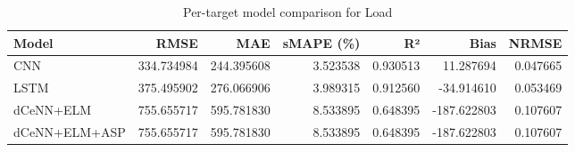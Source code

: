 \begin{table}
\caption{Per-target model comparison for Load}
\begin{tabular}{lrrrrrr}
\toprule
Model & RMSE & MAE & sMAPE (\%) & R² & Bias & NRMSE \\
\midrule
CNN & 334.734984 & 244.395608 & 3.523538 & 0.930513 & 11.287694 & 0.047665 \\
LSTM & 375.495902 & 276.066906 & 3.989315 & 0.912560 & -34.914610 & 0.053469 \\
dCeNN+ELM & 755.655717 & 595.781830 & 8.533895 & 0.648395 & -187.622803 & 0.107607 \\
dCeNN+ELM+ASP & 755.655717 & 595.781830 & 8.533895 & 0.648395 & -187.622803 & 0.107607 \\
\bottomrule
\end{tabular}
\end{table}
